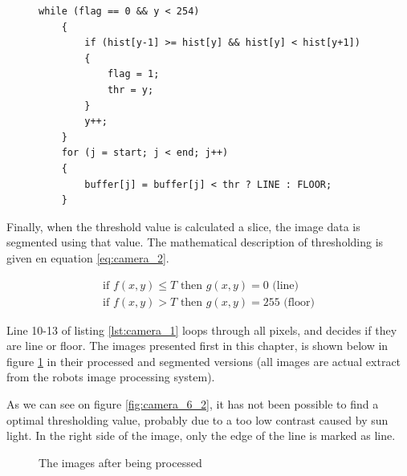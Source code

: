 \lstset{language=C,basicstyle=\tiny,numbers=left}
\begin{figure}
\begin{lstlisting}[frame=single,caption=Part of the thresholding code,label=lst:camera_1]
	while (flag == 0 && y < 254)
	{
		if (hist[y-1] >= hist[y] && hist[y] < hist[y+1]) 
		{
			flag = 1;
			thr = y;
		}
		y++;
	}
	for (j = start; j < end; j++)
	{
		buffer[j] = buffer[j] < thr ? LINE : FLOOR;
	}
\end{lstlisting}
\end{figure}

Finally, when the threshold value is calculated a slice, the image data is segmented using that value. The mathematical description of thresholding is given en equation \ref{eq:camera_2}.

\begin{equation}\label{eq:camera_2}
\begin{split}
	\text{if } f(x,y) \leq T \text{ then } g(x,y) = 0 \text{ (line) } \\
	\text{if } f(x,y) > T \text{ then } g(x,y) = 255 \text{ (floor)}
\end{split}
\end{equation}



Line 10-13 of listing \ref{lst:camera_1} loops through all pixels, and decides if they are line or floor. The images presented first in this chapter, is shown below in figure \ref{fig:camera_6} in their processed and segmented versions (all images are actual extract from the robots image processing system).

As we can see on figure \ref{fig:camera_6_2}, it has not been possible to find a optimal thresholding value, probably due to a too low contrast caused by sun light. In the right side of the image, only the edge of the line is marked as line. 

\begin{figure}[!ht]
	\centering
	\caption{The images after being processed}
	\label{fig:camera_6}
\end{figure}


